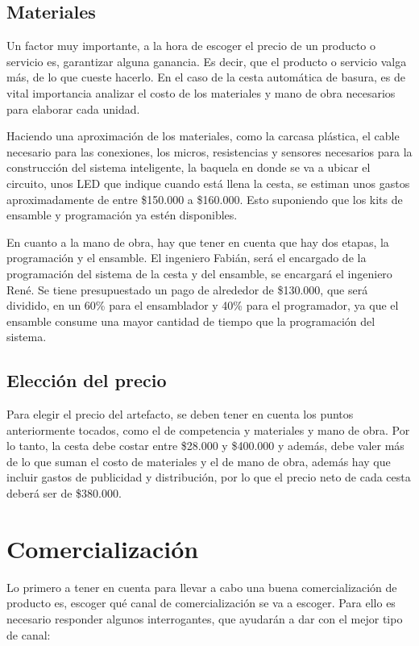 \documentclass{report}
\begin{document}
    \section{Materiales}
    Un factor muy importante, a la hora de escoger el precio de un producto o servicio es, garantizar alguna ganancia. Es decir, que el producto o servicio valga más, de lo que cueste hacerlo. En el caso de la cesta automática de basura, es de vital importancia analizar el costo de los materiales y mano de obra necesarios para elaborar cada unidad. 
    
    Haciendo una aproximación de los materiales, como la carcasa plástica, el cable necesario para las conexiones, los micros, resistencias y sensores necesarios para la construcción del sistema inteligente, la baquela en donde se va a ubicar el circuito, unos LED que indique cuando está llena la cesta, se estiman unos gastos aproximadamente de entre \$150.000 a \$160.000. Esto suponiendo que los kits de ensamble y programación ya estén disponibles.
    
    En cuanto a la mano de obra, hay que tener en cuenta que hay dos etapas, la programación y el ensamble. El ingeniero Fabián, será el encargado de la programación del sistema de la cesta y del ensamble, se encargará el ingeniero René. Se tiene presupuestado un pago de alrededor de \$130.000, que será dividido, en un 60\% para el ensamblador y 40\% para el programador, ya que el ensamble consume una mayor cantidad de tiempo que la programación del sistema.
    
    \section{Elección del precio}
    Para elegir el precio del artefacto, se deben tener en cuenta los puntos anteriormente tocados, como el de competencia y materiales y mano de obra. Por lo tanto, la cesta debe costar entre \$28.000 y \$400.000 y además, debe valer más de lo que suman el costo de materiales y el de mano de obra, además hay que incluir gastos de publicidad y distribución, por lo que el precio neto de cada cesta deberá ser de \$380.000.
    
\chapter{Comercialización}
    Lo primero a tener en cuenta para llevar a cabo una buena comercialización de producto es, escoger qué canal de comercialización se va a escoger. Para ello es necesario responder algunos interrogantes, que ayudarán a dar con el mejor tipo de canal:
    
\end{document}
